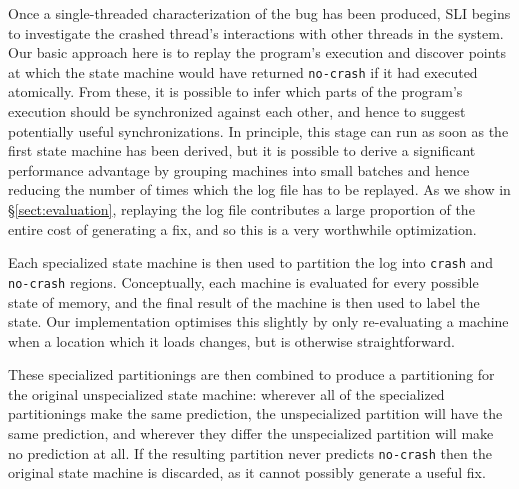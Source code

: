 Once a single-threaded characterization of the bug has been produced,
SLI begins to investigate the crashed thread's interactions with other
threads in the system.  Our basic approach here is to replay the
program's execution and discover points at which the state machine
would have returned \verb|no-crash| if it had executed atomically.
From these, it is possible to infer which parts of the program's
execution should be synchronized against each other, and hence to
suggest potentially useful synchronizations.  In principle, this stage
can run as soon as the first state machine has been derived, but it is
possible to derive a significant performance advantage by grouping
machines into small batches and hence reducing the number of times
which the log file has to be replayed.  As we show in
\S\ref{sect:evaluation}, replaying the log file contributes a large
proportion of the entire cost of generating a fix, and so this is a
very worthwhile optimization.

Each specialized state machine is then used to partition the log into
\verb|crash| and \verb|no-crash| regions.  Conceptually, each machine
is evaluated for every possible state of memory, and the final result
of the machine is then used to label the state.  Our implementation
optimises this slightly by only re-evaluating a machine when a
location which it loads changes, but is otherwise straightforward.

These specialized partitionings are then combined to produce a
partitioning for the original unspecialized state machine: wherever
all of the specialized partitionings make the same prediction, the
unspecialized partition will have the same prediction, and wherever
they differ the unspecialized partition will make no prediction at
all.  If the resulting partition never predicts \verb|no-crash| then
the original state machine is discarded, as it cannot possibly
generate a useful fix.


